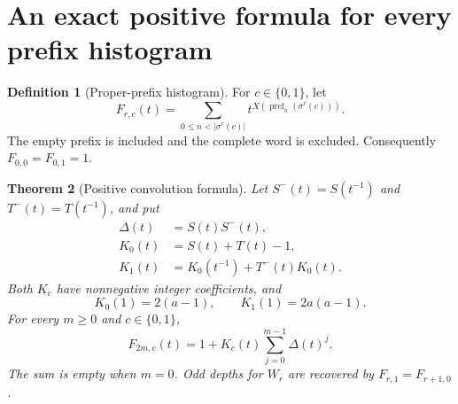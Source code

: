 \documentclass[11pt]{article}
\numberwithin{equation}{section}
\newtheorem{theorem}{Theorem}[section]
\theoremstyle{definition}
\newtheorem{definition}[theorem]{Definition}
\theoremstyle{remark}
\newcommand{\pref}{\operatorname{pref}}
\begin{document}
\section{An exact positive formula for every prefix histogram}\label{bmf:sec:histogram}

\begin{definition}[Proper-prefix histogram]
For $c\in\{0,1\}$, let
\begin{equation}\label{bmf:eq:Fdef}
 F_{r,c}(t)=
 \sum_{0\leq n<|\sigma^r(c)|}
 t^{X(\pref_n(\sigma^r(c)))}.
\end{equation}
The empty prefix is included and the complete word is excluded.
Consequently $F_{0,0}=F_{0,1}=1$.
\end{definition}

\begin{theorem}[Positive convolution formula]\label{bmf:thm:histogram}
Let $S^-(t)=S(t^{-1})$ and $T^-(t)=T(t^{-1})$, and put
\begin{align}
 \Delta(t)&=S(t)S^-(t),\label{bmf:eq:Delta}\\
 K_0(t)&=S(t)+T(t)-1,\label{bmf:eq:K0}\\
 K_1(t)&=K_0(t^{-1})+T^-(t)K_0(t).\label{bmf:eq:K1}
\end{align}
Both $K_c$ have nonnegative integer coefficients, and
\begin{equation}\label{bmf:eq:Kmass}
 K_0(1)=2(a-1),\qquad K_1(1)=2a(a-1).
\end{equation}
For every $m\geq0$ and $c\in\{0,1\}$,
\begin{equation}\label{bmf:eq:positive-hist}
 \boxed{\displaystyle
 F_{2m,c}(t)=1+K_c(t)\sum_{j=0}^{m-1}\Delta(t)^j.}
\end{equation}
The sum is empty when $m=0$. Odd depths for $W_r$ are recovered by
$F_{r,1}=F_{r+1,0}$.
\end{theorem}
\end{document}
